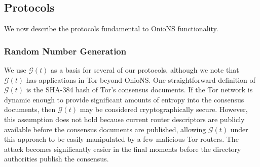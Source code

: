 \documentclass[USenglish,oneside,twocolumn]{article}
\begin{document}



\subsection{Protocols}
\label{sec:protocols}

We now describe the protocols fundamental to OnioNS functionality.%


\subsubsection{Random Number Generation}
\label{sec:rngProcess}

We use $ \mathcal{G}(t) $ as a basis for several of our protocols, although we note that $ \mathcal{G}(t) $ has applications in Tor beyond OnioNS. One straightforward definition of $ \mathcal{G}(t) $ is the SHA-384 hash of Tor's consensus documents. If the Tor network is dynamic enough to provide significant amounts of entropy into the consensus documents, then $ \mathcal{G}(t) $ may be considered cryptographically secure. However, this assumption does not hold because current router descriptors are publicly available before the consensus documents are published, allowing $ \mathcal{G}(t) $ under this approach to be easily manipulated by a few malicious Tor routers. The attack becomes significantly easier in the final moments before the directory authorities publish the consensus.
\end{document}
